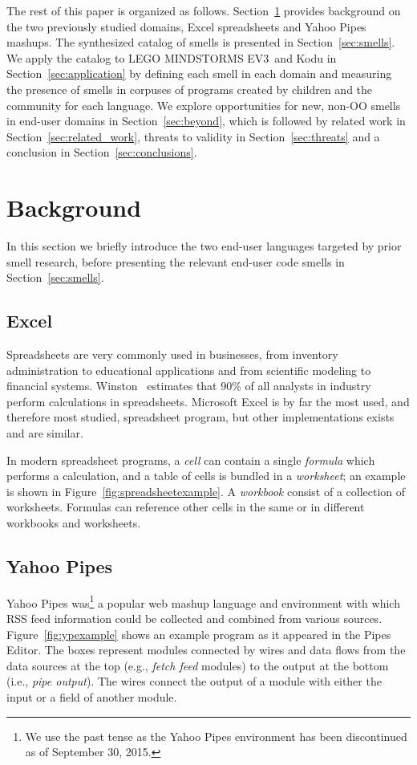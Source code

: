 \documentclass{sig-alternate}
\newcommand{\ms}{LEGO MINDSTORMS EV3}
\begin{document}
The rest of this paper is organized as follows. Section~\ref{sec:background} provides background on the two previously studied domains, Excel spreadsheets and Yahoo Pipes mashups. The synthesized catalog of smells is presented in Section~\ref{sec:smells}. We apply the catalog to \ms~and Kodu in Section~\ref{sec:application} by defining each smell in each domain and measuring the presence of smells in corpuses of programs created by children and the community for each language. We explore opportunities for new, non-OO smells in end-user domains in Section~\ref{sec:beyond}, which is followed by related work in Section~\ref{sec:related_work}, threats to validity in Section~\ref{sec:threats} and a conclusion in Section~\ref{sec:conclusions}. 

\section{Background}
\label{sec:background}
In this section we briefly introduce the two end-user languages targeted by prior smell research, before presenting the relevant end-user code smells in Section~\ref{sec:smells}.

\subsection{Excel} Spreadsheets are very commonly used in businesses, from inventory administration to educational applications and from scientific modeling to financial systems.
Winston~\cite{Wins2001} estimates that 90\% of all analysts in industry perform calculations in spreadsheets. 
Microsoft Excel is by far the most used, and therefore most studied, spreadsheet program, but other implementations exists and are similar.

In modern spreadsheet programs, a \textit{cell} can contain a single \textit{formula} which performs a calculation, and a table of cells is bundled in a \textit{worksheet}; an example is shown in Figure~\ref{fig:spreadsheetexample}. 
A \textit{workbook} consist of a collection of worksheets.
Formulas can reference other cells in the same or in different workbooks and worksheets.



\subsection{Yahoo Pipes}
Yahoo Pipes was\footnote{We use the past tense as the Yahoo Pipes environment has been discontinued as of September 30, 2015.} a popular web mashup language and environment with which RSS feed information could be collected and combined from various sources.  Figure~\ref{fig:ypexample} shows an example program as it appeared in the Pipes Editor. The boxes represent modules connected by wires and data flows from the data sources at the top  (e.g., \emph{fetch feed} modules) to the output at the bottom (i.e., \emph{pipe output}). The wires connect the output of a module with either the input or a field of another module. 
\end{document}
